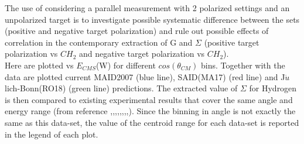 The use of considering a parallel measurement with 2 polarized settings and an unpolarized target is to investigate possible systematic difference between the sets (positive and negative target polarization) and rule out possible effects of correlation in the contemporary extraction of G and $\Sigma$ (positive target polarization vs $CH_2$ and negative target polarization vs $CH_2$). \\
 Here are plotted vs $E_{CMS}$(W) for different $cos(\theta_{CM})$ bins. Together with the data are plotted current MAID2007 \cite{MAID_2007} (blue line), SAID(MA17) \cite{PhysRevC.96.035204} (red line) and J$\ddot{u}$lich-Bonn(RO18) \cite{Ronchen:2018ury} (green line) predictions.
The extracted value of $\Sigma$ for Hydrogen is then compared to existing experimental results that cover the same angle and energy range (from reference \cite{AJ00},\cite{KE74},\cite{BA02},\cite{DU13},\cite{HM80},\cite{BS79},\cite{AS72},\cite{AB80},\cite{AB74}). Since the binning in angle is not exactly the same as this data-set, the value of the centroid range for each data-set is reported in the legend of each plot. 

